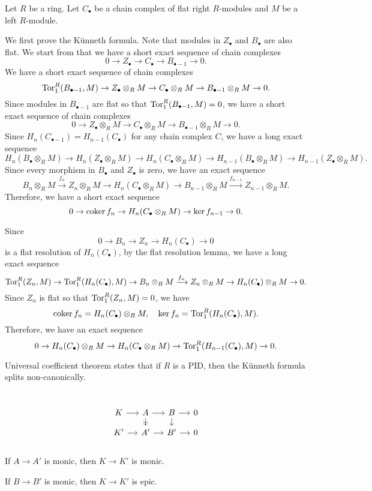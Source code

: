 \documentclass{../../large}
\begin{document}
\begin{prb}
Let $R$ be a ring.
Let $C_\bullet$ be a chain complex of flat right $R$-modules and $M$ be a left $R$-module.
\end{prb}
\begin{pf}
We first prove the K\"unneth formula.
Note that modules in $Z_\bullet$ and $B_\bullet$ are also flat.
We start from that we have a short exact sequence of chain complexes
\[0\to Z_\bullet\to C_\bullet\to B_{\bullet-1}\to0.\]
We have a short exact sequence of chain complexes
\[\operatorname{Tor}_1^R(B_{\bullet-1},M)\to Z_\bullet\otimes_RM\to C_\bullet\otimes_RM\to B_{\bullet-1}\otimes_RM\to0.\]
Since modules in $B_{\bullet-1}$ are flat so that $\operatorname{Tor}_1^R(B_{\bullet-1},M)=0$, we have a short exact sequence of chain complexes
\[0\to Z_\bullet\otimes_RM\to C_\bullet\otimes_RM\to B_{\bullet-1}\otimes_RM\to0.\]
Since $H_n(C_{\bullet-1})=H_{n-1}(C_\bullet)$ for any chain complex $C$, we have a long exact sequence
\[H_n(B_\bullet\otimes_RM)\to H_n(Z_\bullet\otimes_RM)\to H_n(C_\bullet\otimes_RM)\to H_{n-1}(B_\bullet\otimes_RM)\to H_{n-1}(Z_\bullet\otimes_RM).\]
Since every morphism in $B_\bullet$ and $Z_\bullet$ is zero, we have an exact sequence
\[B_n\otimes_RM\xrightarrow{f_n}Z_n\otimes_RM\to H_n(C_\bullet\otimes_RM)\to B_{n-1}\otimes_RM\xrightarrow{f_{n-1}}Z_{n-1}\otimes_RM.\]
Therefore, we have a short exact sequence
\[0\to\operatorname{coker} f_n\to H_n(C_\bullet\otimes_RM)\to\ker f_{n-1}\to0.\]

Since
\[0\to B_n\to Z_n\to H_n(C_\bullet)\to0\]
is a flat resolution of $H_n(C_\bullet)$, by the flat resolution lemma, we have a long exact sequence
\[\operatorname{Tor}_1^R(Z_n,M)\to\operatorname{Tor}_1^R(H_n(C_\bullet),M)\to B_n\otimes_RM\xrightarrow{f_n}Z_n\otimes_RM\to H_n(C_\bullet)\otimes_RM\to0.\]
Since $Z_n$ is flat so that $\operatorname{Tor}_1^R(Z_n,M)=0$, we have
\[\operatorname{coker} f_n=H_n(C_\bullet)\otimes_RM,\quad\ker f_n=\operatorname{Tor}_1^R(H_n(C_\bullet),M).\]
Therefore, we have an exact sequence
\[0\to H_n(C_\bullet)\otimes_RM\to H_n(C_\bullet\otimes_RM)\to\operatorname{Tor}_1^R(H_{n-1}(C_\bullet),M)\to0.\]

Universal coefficient theorem states that if $R$ is a PID, then the K\"unneth formula splits non-canonically.
\end{pf}




\chapter{}

\[\begin{tikzcd}[sep=small]
K \rar & A \rar\dar[->>] & B \rar\dar & 0\\
K' \rar & A' \rar & B' \rar & 0\\
\end{tikzcd}\]
\begin{parts}
\item If $A\to A'$ is monic, then $K\to K'$ is monic.
\item If $B\to B'$ is monic, then $K\to K'$ is epic.
\end{parts}
\end{document}
